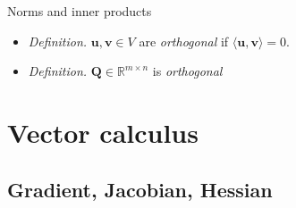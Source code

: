 \documentclass{beamer}
\numberwithin{equation}{section}
\begin{document}
\begin{frame}{Norms and inner products}
    \begin{itemize}
        \item
	    \textit{Definition.} $ \mathbf{u}, \mathbf{v} \in V $ are
	    \textit{orthogonal} if $ \langle\mathbf{u}, \mathbf{v}\rangle = 0 $.

        \item
        \textit{Definition.} $ \mathbf{Q} \in \mathbb{R}^{m \times n} $ is
        \textit{orthogonal}
    \end{itemize}
\end{frame}


\section{Vector calculus}

\subsection{Gradient, Jacobian, Hessian}
\end{document}
